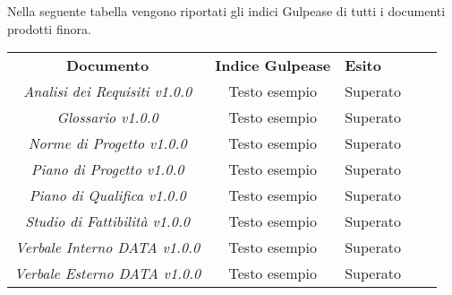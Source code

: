Nella seguente tabella vengono riportati gli indici Gulpease\glo{} di tutti
i documenti prodotti finora.
\begin{table}[H]
    \caption{Tabella dell'indice di Gulpease}
\renewcommand{\arraystretch}{1.5}
\begin{longtable}{ c c  C{4cm}  c  c }
    \rowcolor{\primaryColor}
    \textcolor{\secondaryColor}{
    \centering\textbf{Documento}}     & \textcolor{\secondaryColor}{\centering\textbf{Indice Gulpease}}    & \textcolor{\secondaryColor}
    {\centering\textbf{Esito}} \\
    \textit{Analisi dei Requisiti v1.0.0}                & Testo esempio                                    & Superato{} \\
    \textit{Glossario v1.0.0}                & Testo esempio                                    & Superato{} \\
    \textit{Norme di Progetto v1.0.0}               & Testo esempio                                    & Superato{} \\
    \textit{Piano di Progetto v1.0.0}                & Testo esempio                                    & Superato{} \\
    \textit{Piano di Qualifica v1.0.0}                & Testo esempio                                    & Superato{} \\
    \textit{Studio di Fattibilità v1.0.0}                & Testo esempio                                    & Superato{} \\
    \textit{Verbale Interno DATA v1.0.0}                & Testo esempio                                    & Superato{} \\
    \textit{Verbale Esterno DATA v1.0.0}                & Testo esempio                                    & Superato{} \\
\end{longtable}
\end{table}



